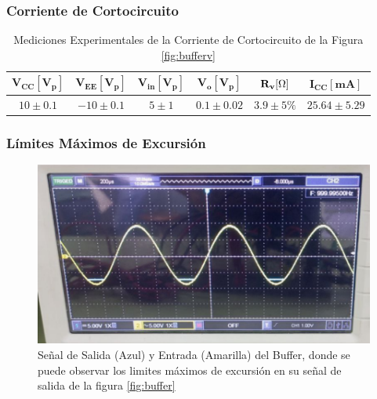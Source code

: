     \subsubsection{Corriente de Cortocircuito}

        \begin{table}[H]
          \centering
          \begin{tabular}{|c|c|c|c|c|c|}
            \hline
            $\mathbf{V_{CC} [V_p]}$ & $\mathbf{V_{EE} [V_p]}$ & $\mathbf{V_{in} [V_p]}$ & $\mathbf{V_o [V_p]}$ & $\mathbf{R_v [\ohm]}$ & $\mathbf{I_{CC} [mA]}$ \\
            \hline
            $10 \pm 0.1$ & $-10 \pm 0.1$ & $5 \pm 1$ & $0.1 \pm 0.02$ & $3.9 \pm 5\%$ & $25.64 \pm 5.29$ \\
            \hline
          \end{tabular}
          \caption{Mediciones Experimentales de la Corriente de Cortocircuito de la Figura \ref{fig:bufferv}}
          \label{tab:corriente_cc}
        \end{table}

    \subsubsection{Límites Máximos de Excursión}    

        \begin{figure}[H]
            \centering
            \renewcommand{\figurename}{Imagen}
            \includegraphics[width=15cm]{Imagenes/exp_buffer_limites.png}
            \caption{Señal de Salida (Azul) y Entrada (Amarilla) del Buffer, donde se puede observar los limites máximos de excursión en su señal de salida de la figura \ref{fig:buffer}}
            \label{fig:exp_buffer_limites}
        \end{figure}

